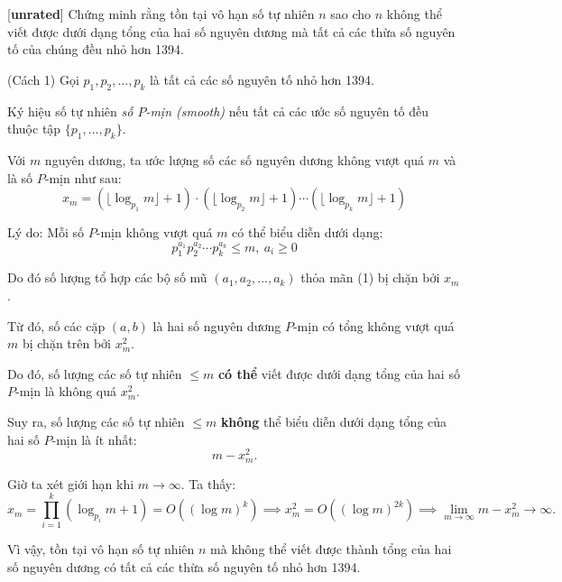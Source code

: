 \documentclass[../09-contruction-methods.tex]{subfiles}
\begin{document}
\begin{example*}\label{example:IRN-2015-N1}[\textbf{unrated}]
	Chứng minh rằng tồn tại vô hạn số tự nhiên \( n \) sao cho \( n \) không thể viết được dưới dạng tổng của hai số nguyên dương
	mà tất cả các thừa số nguyên tố của chúng đều nhỏ hơn 1394.
\end{example*}

\begin{soln}(Cách 1)\footnotemark
	Gọi \( p_1, p_2, \dots, p_k \) là tất cả các số nguyên tố nhỏ hơn 1394.

	Ký hiệu số tự nhiên \textit{số \( P \)-mịn (smooth)} nếu tất cả các ước số nguyên tố đều thuộc tập \( \{p_1, \dots, p_k\} \).
	
	Với \( m \) nguyên dương, ta ước lượng số các số nguyên dương không vượt quá \( m \) và là số \( P \)-mịn như sau:
	\[
		x_m = (\lfloor \log_{p_1} m \rfloor + 1) \cdot (\lfloor \log_{p_2} m \rfloor + 1) \cdots (\lfloor \log_{p_k} m \rfloor + 1)
	\]
	
	Lý do: Mỗi số \( P \)-mịn không vượt quá \( m \) có thể biểu diễn dưới dạng:
	\[
		p_1^{a_1} p_2^{a_2} \cdots p_k^{a_k} \leq m,\  a_i \geq 0 \tag{1}
	\]
	
	Do đó số lượng tổ hợp các bộ số mũ \( (a_1, a_2, \dots, a_k) \) thỏa mãn (1) bị chặn bởi \( x_m \).
	
	Từ đó, số các cặp \( (a, b) \) là hai số nguyên dương \( P \)-mịn có tổng không vượt quá \( m \) bị chặn trên bởi \( x_m^2 \).
	
	Do đó, số lượng các số tự nhiên \( \leq m \) \textbf{có thể} viết được dưới dạng tổng của hai số \( P \)-mịn là không quá \( x_m^2 \).
	
	Suy ra, số lượng các số tự nhiên \( \leq m \) \textbf{không} thể biểu diễn dưới dạng tổng của hai số \( P \)-mịn là ít nhất:
	\[
		m - x_m^2.
	\]
	
	Giờ ta xét giới hạn khi \( m \to \infty \). Ta thấy:
	\[ x_m = \prod_{i=1}^{k} (\log_{p_i} m + 1) = O((\log m)^k) \implies x_m^2 = O((\log m)^{2k}) \implies \lim_{ m \to \infty} m - x_m^2 \to \infty. \]
	
	Vì vậy, tồn tại vô hạn số tự nhiên \( n \) mà không thể viết được thành tổng của hai số nguyên dương có tất cả các thừa số nguyên tố nhỏ hơn 1394.
\end{soln}

\end{document}
